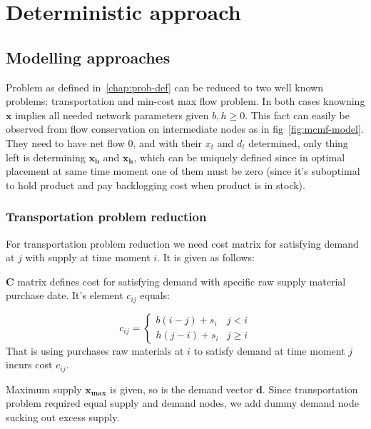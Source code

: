 
\chapter{Deterministic approach}
\label{chap:Deterministic approach}

\section{Modelling approaches}

Problem as defined in~\ref{chap:prob-def} can be reduced to two well known problems: transportation and min-cost max flow problem. In both cases knowning $\mathbf{x}$ implies all needed network parameters given $b, h \ge 0$.  This fact can easily be observed from flow conservation on intermediate nodes as in fig~\ref{fig:mcmf-model}. They need to have net flow 0, and with their $x_t$ and $d_t$ determined, only thing left is determining $\mathbf{x_b}$ and $\mathbf{x_h}$, which can be uniquely defined since in optimal placement at same time moment one of them must be zero (since it's suboptimal to hold product and pay backlogging cost when product is in stock).

\subsection{Transportation problem reduction}
\label{subs:Transportation problem reduction}

For transportation problem reduction we need cost matrix for satisfying demand at $j$ with supply at time moment $i$. It is given as follows:

\begin{definition}{$\mathbf{C}$}
matrix defines cost for satisfying demand with specific raw supply material purchase date. It's element $c_{ij}$ equals:

\begin{equation*}
    c_{ij} = \begin{cases}
        b \left( i - j \right) + s_i & j < i \\
        h \left( j - i \right) + s_i & j \ge i
    \end{cases}
\end{equation*}
That is using purchases raw materials at $i$ to satisfy demand at time moment $j$ incurs cost $c_{ij}$.
\end{definition}

Maximum supply $\mathbf{x_{\max}}$ is given, so is the demand vector $\mathbf{d}$. Since transportation problem required equal supply and demand nodes, we add dummy demand node sucking out excess supply.

